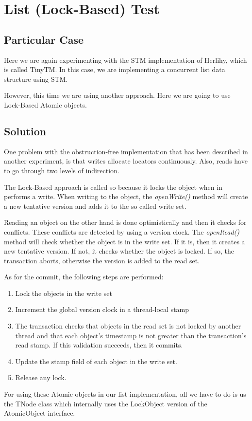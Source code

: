 \section{\textbf{List (Lock-Based) Test}}
\subsection{Particular Case}
\par
Here we are again experimenting with the STM implementation of Herlihy, which is
called TinyTM. In this case, we are implementing a concurrent list data
structure using STM. 
\par
However, this time we are using another approach. Here we are going to use
Lock-Based Atomic objects.
\par
\subsection{Solution}
\par
One problem with the obstruction-free implementation that has been described in
another experiment, is that writes allocate locators continuously. Also, reads
have to go through two levels of indirection. 
\par
The Lock-Based approach is called so because it locks the object when in
performs a write. When writing to the object, the \textit{openWrite()} method
will create a new tentative version and adds it to the so called write set.
\par
Reading an object on the other hand is done optimistically and then it checks
for conflicts. These conflicts are detected by using a version clock. The
\textit{openRead()} method will check whether the object is in the write set. If
it is, then it creates a new tentative version. If not, it checks whether the
object is locked. If so, the transaction aborts, otherwise the version is added
to the read set.
\par
As for the commit, the following steps are performed:
\par
\begin{enumerate}
\item Lock the objects in the write set
\item Increment the global version clock in a thread-local stamp
\item The transaction checks that objects in the read set is not locked by
another thread and that each object's timestamp is not greater than the
transaction's read stamp. If this validation succeeds, then it commits.
\item Update the stamp field of each object in the write set.
\item Release any lock.
\end{enumerate}
\par
For using these Atomic objects in our list implementation, all we have to do is
us the TNode class which internally uses the LockObject version of the
AtomicObject interface.
\par
